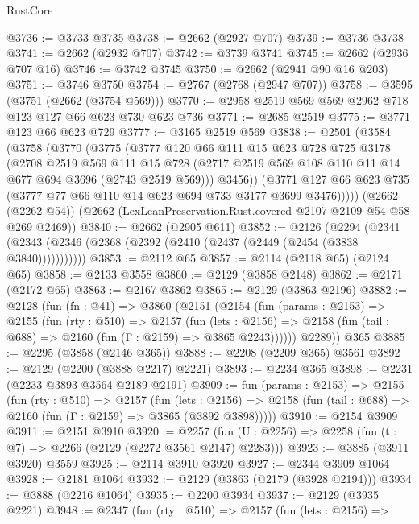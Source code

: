 \begin{lexlean}{RustCore}
\begin{coremodule}
@3736 := @3733 @3735
@3738 := @2662 (@2927 @707)
@3739 := @3736 @3738
@3741 := @2662 (@2932 @707)
@3742 := @3739 @3741
@3745 := @2662 (@2936 @707 @16)
@3746 := @3742 @3745
@3750 := @2662 (@2941 @90 @16 @203)
@3751 := @3746 @3750
@3754 := @2767 (@2768 (@2947 @707))
@3758 := @3595 (@3751 (@2662 (@3754 @569)))
@3770 := @2958 @2519 @569 @569 @2962 @718 @123 @127 @66 @623 @730 @623 @736
@3771 := @2685 @2519
@3775 := @3771 @123 @66 @623 @729
@3777 := @3165 @2519 @569
@3838 := @2501
    (@3584
      (@3758
        (@3770
          (@3775
            (@3777
              @120
              @66
              @111
              @15
              @623
              @728
              @725
              @3178
              (@2708
                @2519
                @569
                @111
                @15
                @728
                (@2717 @2519 @569 @108 @110 @11 @14 @677 @694 @3696 (@2743 @2519 @569)))
              @3456))
          (@3771 @127 @66 @623 @735 (@3777 @77 @66 @110 @14 @623 @694 @733 @3177 @3699 @3476)))))
    (@2662 (@2262 @54))
    (@2662 (LexLeanPreservation.Rust.covered @2107 @2109 @54 @58 @269 @2469))
@3840 := @2662 (@2905 @611)
@3852 := @2126
    (@2294 (@2341 (@2343 (@2346 (@2368 (@2392 (@2410 (@2437 (@2449 (@2454 (@3838 @3840)))))))))))
@3853 := @2112 @65
@3857 := @2114 (@2118 @65) (@2124 @65)
@3858 := @2133 @3558
@3860 := @2129 (@3858 @2148)
@3862 := @2171 (@2172 @65)
@3863 := @2167 @3862
@3865 := @2129 (@3863 @2196)
@3882 := @2128
    (fun (fn : @41) =>
    @3860
      (@2151
        (@2154
          (fun (params : @2153) =>
          @2155
            (fun (rty : @510) =>
            @2157
              (fun (lets : @2156) =>
              @2158 (fun (tail : @688) => @2160 (fun (Γ : @2159) => @3865 @2243))))))
        @2289))
    @365
@3885 := @2295 (@3858 (@2146 @365))
@3888 := @2208 (@2209 @365) @3561
@3892 := @2129 (@2200 (@3888 @2217) @2221)
@3893 := @2234 @365
@3898 := @2231 (@2233 @3893 @3564 @2189 @2191)
@3909 := fun (params : @2153) =>
  @2155
    (fun (rty : @510) =>
    @2157
      (fun (lets : @2156) =>
      @2158 (fun (tail : @688) => @2160 (fun (Γ : @2159) => @3865 (@3892 @3898)))))
@3910 := @2154 @3909
@3911 := @2151 @3910
@3920 := @2257 (fun (U : @2256) => @2258 (fun (t : @7) => @2266 (@2129 (@2272 @3561 @2147) @2283)))
@3923 := @3885 (@3911 @3920) @3559
@3925 := @2114 @3910 @3920
@3927 := @2344 @3909 @1064
@3928 := @2181 @1064
@3932 := @2129 (@3863 (@2179 (@3928 @2194)))
@3934 := @3888 (@2216 @1064)
@3935 := @2200 @3934
@3937 := @2129 (@3935 @2221)
@3948 := @2347
    (fun (rty : @510) =>
    @2157
      (fun (lets : @2156) =>

\end{coremodule}
\end{lexlean}
